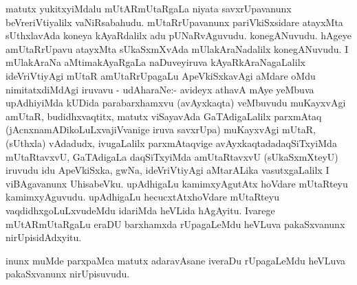 \begin{artha}
matutx yukitxyiMdalu mUtARmUtaRgaLa niyata savxrUpavanunx
 beVreriVtiyalilx vaNiRsabahudu. mUtaRrUpavanunx pariVkiSxsidare
atayxMta sUthxlavAda koneya kAyaRdalilx adu
pUNaRvAguvudu. konegANuvudu. hAgeye amUtaRrUpavu atayxMta sUkaSxmXvAda
mUlakAraNadalilx konegANuvudu. I mUlakAraNa aMtimakAyaRgaLa
naDuveyiruva kAyaRkAraNagaLalilx ideVriVtiyAgi mUtaR amUtaRrUpagaLu
ApeVkiSxkavAgi aMdare oMdu nimitatxdiMdAgi iruvavu - udAharaNe:-
avideyx athavA mAye yeMbuva upAdhiyiMda kUDida parabarxhamxvu
(avAyxkaqta) veMbuvudu muKayxvAgi amUtaR, budidhxvaqtitx, matutx
viSayavAda GaTAdigaLalilx parxmAtaq (jAcnxnamADikoLuLxvajiVvanige iruva
savxrUpa) muKayxvAgi mUtaR, (sUthxla) vAdadudx, ivugaLalilx
parxmAtaqvige avAyxkaqtadadaqSiTxyiMda mUtaRtavxvU, GaTAdigaLa
daqSiTxyiMda amUtaRtavxvU (sUkaSxmXteyU) iruvudu idu ApeVkiSxka, gwNa,
ideVriVtiyAgi aMtarALika vasutxgaLalilx I viBAgavanunx
UhisabeVku. upAdhigaLu kamimxyAgutAtx hoVdare mUtaRteyu
kamimxyAguvudu. upAdhigaLu hecucxtAtxhoVdare mUtaRteyu
vaqdidhxgoLuLxvudeMdu idariMda heVLida hAgAyitu. Ivarege
mUtARmUtaRgaLu eraDU barxhamxda rUpagaLeMdu heVLuva pakaSxvanunx
nirUpisidAdxyitu.
\end{artha}

\begin{artha}
inunx muMde parxpaMca matutx adaravAsane iveraDu rUpagaLeMdu heVLuva
pakaSxvanunx nirUpisuvudu.
\end{artha}

\centerline{}

